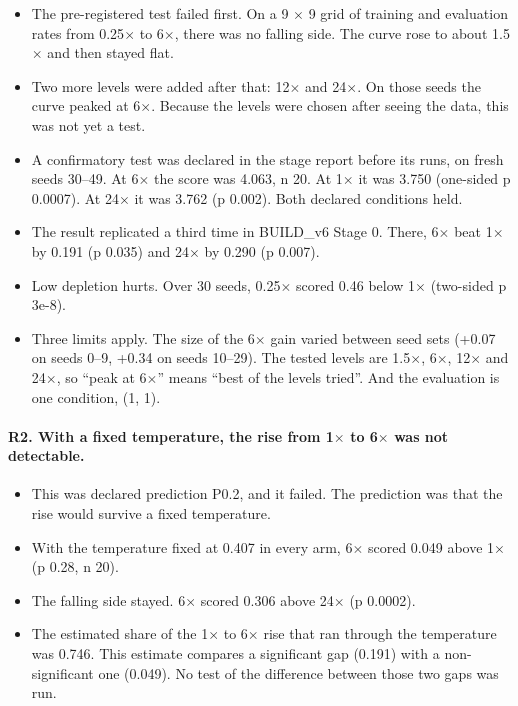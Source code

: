\documentclass[11pt]{article}
\begin{document}
\begin{itemize}
\item The pre-registered test failed first. On a 9 $\times$ 9 grid of training and evaluation rates from 0.25$\times$ to 6$\times$, there was no falling side. The curve rose to about 1.5$\times$ and then stayed flat.
\item Two more levels were added after that: 12$\times$ and 24$\times$. On those seeds the curve peaked at 6$\times$. Because the levels were chosen after seeing the data, this was not yet a test.
\item A confirmatory test was declared in the stage report before its runs, on fresh seeds 30--49. At 6$\times$ the score was 4.063, n 20. At 1$\times$ it was 3.750 (one-sided p 0.0007). At 24$\times$ it was 3.762 (p 0.002). Both declared conditions held.
\item The result replicated a third time in BUILD\_v6 Stage 0. There, 6$\times$ beat 1$\times$ by 0.191 (p 0.035) and 24$\times$ by 0.290 (p 0.007).
\item Low depletion hurts. Over 30 seeds, 0.25$\times$ scored 0.46 below 1$\times$ (two-sided p 3e-8).
\item Three limits apply. The size of the 6$\times$ gain varied between seed sets (+0.07 on seeds 0--9, +0.34 on seeds 10--29). The tested levels are 1.5$\times$, 6$\times$, 12$\times$ and 24$\times$, so ``peak at 6$\times$'' means ``best of the levels tried''. And the evaluation is one condition, (1, 1).
\end{itemize}

\paragraph{R2. With a fixed temperature, the rise from 1$\times$ to 6$\times$ was not detectable.}

\begin{itemize}
\item This was declared prediction P0.2, and it failed. The prediction was that the rise would survive a fixed temperature.
\item With the temperature fixed at 0.407 in every arm, 6$\times$ scored 0.049 above 1$\times$ (p 0.28, n 20).
\item The falling side stayed. 6$\times$ scored 0.306 above 24$\times$ (p 0.0002).
\item The estimated share of the 1$\times$ to 6$\times$ rise that ran through the temperature was 0.746. This estimate compares a significant gap (0.191) with a non-significant one (0.049). No test of the difference between those two gaps was run.
\end{itemize}
\end{document}
